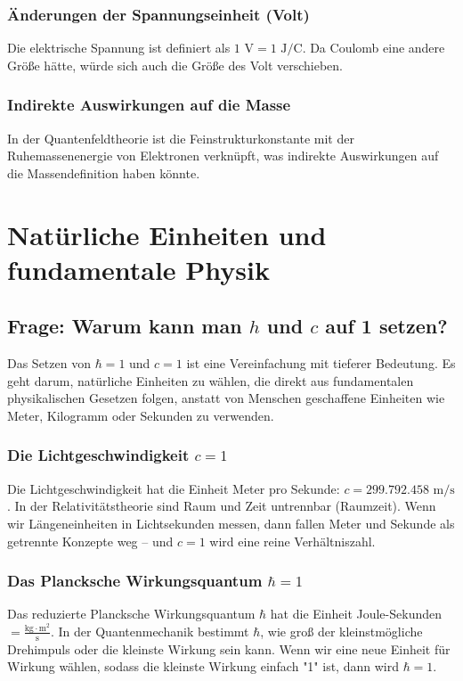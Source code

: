 \documentclass{article}
\begin{document}
\subsubsection{Änderungen der Spannungseinheit (Volt)}
Die elektrische Spannung ist definiert als $1 \text{ V} = 1 \text{ J}/\text{C}$. Da Coulomb eine andere Größe hätte, würde sich auch die Größe des Volt verschieben.

\subsubsection{Indirekte Auswirkungen auf die Masse}
In der Quantenfeldtheorie ist die Feinstrukturkonstante mit der Ruhemassenenergie von Elektronen verknüpft, was indirekte Auswirkungen auf die Massendefinition haben könnte.

\section{Natürliche Einheiten und fundamentale Physik}

\subsection{Frage: Warum kann man $h$ und $c$ auf 1 setzen?}

Das Setzen von $\hbar = 1$ und $c = 1$ ist eine Vereinfachung mit tieferer Bedeutung. Es geht darum, natürliche Einheiten zu wählen, die direkt aus fundamentalen physikalischen Gesetzen folgen, anstatt von Menschen geschaffene Einheiten wie Meter, Kilogramm oder Sekunden zu verwenden.

\subsubsection{Die Lichtgeschwindigkeit $c = 1$}
Die Lichtgeschwindigkeit hat die Einheit Meter pro Sekunde: $c = 299.792.458 \text{ m/s}$. In der Relativitätstheorie sind Raum und Zeit untrennbar (Raumzeit). Wenn wir Längeneinheiten in Lichtsekunden messen, dann fallen Meter und Sekunde als getrennte Konzepte weg – und $c = 1$ wird eine reine Verhältniszahl.

\subsubsection{Das Plancksche Wirkungsquantum $\hbar = 1$}
Das reduzierte Plancksche Wirkungsquantum $\hbar$ hat die Einheit Joule-Sekunden $= \frac{\text{kg} \cdot \text{m}^2}{\text{s}}$. In der Quantenmechanik bestimmt $\hbar$, wie groß der kleinstmögliche Drehimpuls oder die kleinste Wirkung sein kann. Wenn wir eine neue Einheit für Wirkung wählen, sodass die kleinste Wirkung einfach "1" ist, dann wird $\hbar = 1$.
\end{document}
